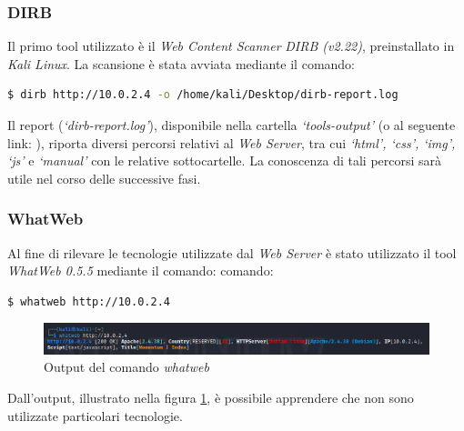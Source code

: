 \subsubsection{DIRB}
Il primo tool utilizzato è il \emph{Web Content Scanner} \emph{DIRB (v2.22)}, preinstallato in \emph{Kali Linux}. La scansione è stata avviata mediante il comando:
\begin{lstlisting}[language=bash]
    $ dirb http://10.0.2.4 -o /home/kali/Desktop/dirb-report.log 
\end{lstlisting}
Il report (\emph{`dirb-report.log'}), disponibile nella cartella \emph{`tools-output'} (o al seguente link: ), riporta diversi percorsi relativi al \emph{Web Server}, tra cui \emph{`html', `css', `img', `js'} e \emph{`manual'} con le relative sottocartelle. La conoscenza di tali percorsi sarà utile nel corso delle successive fasi.
\subsubsection{WhatWeb}
Al fine di rilevare le tecnologie utilizzate dal \emph{Web Server} è stato utilizzato il tool \emph{WhatWeb 0.5.5} mediante il comando:
comando:
\begin{lstlisting}[language=bash]
    $ whatweb http://10.0.2.4 
\end{lstlisting}
\begin{figure}[h]
    \centering
    \includegraphics[scale=0.5]{capitoli/images/whatweb.png}
    \caption{Output del comando \emph{whatweb}}
    \label{fig:whatweb}
\end{figure}
Dall'output, illustrato nella figura \ref{fig:whatweb}, è possibile apprendere che non sono utilizzate particolari tecnologie. 
